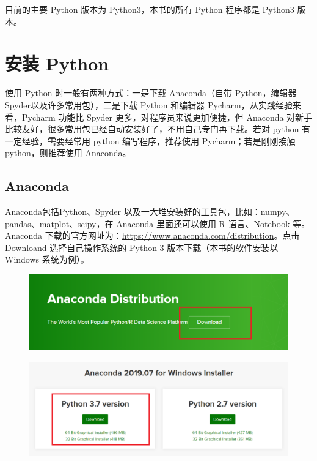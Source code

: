 目前的主要 Python 版本为 Python3，本书的所有 Python 程序都是 Python3 版本。

\clearpage
\section{安装 Python}

使用 Python 时一般有两种方式：一是下载 Anaconda（自带 Python，编辑器 Spyder以及许多常用包），二是下载 Python 和编辑器 Pycharm，从实践经验来看，Pycharm 功能比 Spyder 更多，对程序员来说更加便捷，但 Anaconda 对新手比较友好，很多常用包已经自动安装好了，不用自己专门再下载。若对 python 有一定经验，需要经常用 python 编写程序，推荐使用 Pycharm；若是刚刚接触 python，则推荐使用 Anaconda。

\subsection{Anaconda}

Anaconda包括Python、Spyder 以及一大堆安装好的工具包，比如：numpy、pandas、matplot、scipy，在 Anaconda 里面还可以使用 R 语言、Notebook 等。 Anaconda 下载的官方网址为：\href{https://www.anaconda.com/distribution}{https://www.anaconda.com/distribution}。点击 Downloand 选择自己操作系统的 Python 3 版本下载（本书的软件安装以 Windows 系统为例）。

\begin{figure}[!ht]
  \centering
  \includegraphics[scale=0.5]{figure/chapter1/anaconda.png}
\end{figure}

\begin{figure}[!ht]
  \centering
  \includegraphics[scale=0.5]{figure/chapter1/anaconda2.png}
\end{figure}

